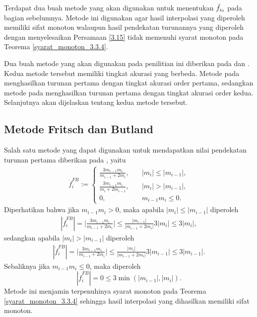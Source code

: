 Terdapat dua buah metode yang akan digunakan untuk menentukan $\Tilde{f}_{i_0}$ pada bagian sebelumnya. Metode ini digunakan agar hasil interpolasi yang diperoleh memiliki sifat monoton walaupun hasil pendekatan turunannya yang diperoleh dengan menyelesaikan Persamaan \eqref{3.15} tidak memenuhi syarat monoton pada Teorema \ref{syarat_monoton_3.3.4}.

Dua buah metode yang akan digunakan pada penilitian ini diberikan pada \cite{fritschMN} dan \cite{arandigaMN}. Kedua metode tersebut memiliki tingkat akurasi yang berbeda. Metode pada \cite{fritschMN} menghasilkan turunan pertama dengan tingkat akurasi order pertama, sedangkan metode pada \cite{arandigaMN} menghasilkan turunan pertama dengan tingkat akurasi order kedua. Selanjutnya akan dijelaskan tentang kedua metode tersebut.

\subsection{Metode Fritsch dan Butland}

Salah satu metode yang dapat digunakan untuk mendapatkan nilai pendekatan turunan pertama diberikan pada \cite{fritschMN}, yaitu
\begin{align}
    \dot{f}_i^{FB}:=\begin{cases}
        \frac{3m_{i-1}m_i}{m_{i-1}+2m_{i}},\quad &|m_i|\leq|m_{i-1}|,\\
        \frac{3m_{i-1}m_i}{m_{i}+2m_{i-1}},\quad &|m_i|>|m_{i-1}|,\\
        0, \quad &m_{i-1}m_i\leq0.
    \end{cases} \label{dotf_FB}
\end{align}
Diperhatikan bahwa jika $m_{i-1}m_i>0$, maka apabila $|m_i|\leq|m_{i-1}|$ diperoleh
\begin{align*}
    |\dot{f}_i^{FB}|=\bigg|\frac{3m_{i-1}m_i}{m_{i-1}+2m_i}\bigg|
    \leq\frac{|m_{i-1}|}{|m_{i-1}+2m_i|}3|m_i|\leq3|m_i|,
\end{align*}
sedangkan apabila $|m_i|>|m_{i-1}|$ diperoleh
\begin{align*}
    |\dot{f}_i^{FB}|=\bigg|\frac{3m_{i-1}m_i}{m_{i-1}+2m_i}\bigg|
    \leq\frac{|m_{i}|}{|m_{i-1}+2m_i|}3|m_{i-1}|\leq3|m_{i-1}|.
\end{align*}
Sebaliknya jika $m_{i-1}m_i\leq0$, maka diperoleh $$|\dot{f}_i^{FB}|=0\leq 3\min(|m_{i-1}|,|m_i|).$$
Metode ini menjamin terpenuhinya syarat monoton pada Teorema \ref{syarat_monoton_3.3.4} sehingga hasil interpolasi yang dihasilkan memiliki sifat monoton.

